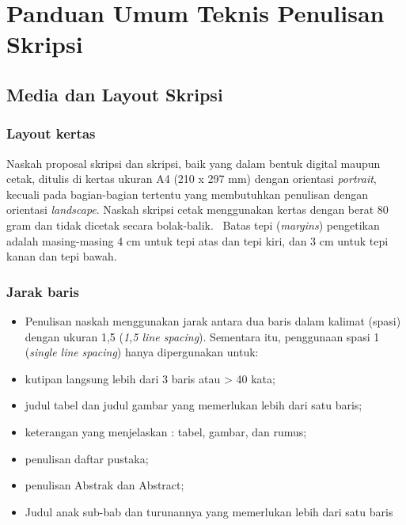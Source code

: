 \documentclass[
  indonesian,
  letterpaper,
]{scrbook}
\providecommand{\tightlist}{%
  \setlength{\itemsep}{0pt}\setlength{\parskip}{0pt}}
\begin{document}
\section{Panduan Umum Teknis Penulisan
Skripsi}\label{panduan-umum-teknis-penulisan-skripsi}

\subsection{Media dan Layout Skripsi}\label{media-dan-layout-skripsi}

\subsubsection{Layout kertas}\label{layout-kertas}

Naskah proposal skripsi dan skripsi, baik yang dalam bentuk digital
maupun cetak, ditulis di kertas ukuran A4 (210 x 297 mm) dengan
orientasi \emph{portrait}, kecuali pada bagian-bagian tertentu yang
membutuhkan penulisan dengan orientasi \emph{landscape}. Naskah skripsi
cetak menggunakan kertas dengan berat 80 gram dan tidak dicetak secara
bolak-balik.~ Batas tepi (\emph{margins}) pengetikan adalah
masing-masing 4 cm untuk tepi atas dan tepi kiri, dan 3 cm untuk tepi
kanan dan tepi bawah.

\subsubsection{Jarak baris}\label{jarak-baris}

\begin{itemize}
\tightlist
\item
  Penulisan naskah menggunakan jarak antara dua baris dalam kalimat
  (spasi) dengan ukuran 1,5 (\emph{1,5 line spacing}). Sementara itu,
  penggunaan spasi 1 (\emph{single line} \emph{spacing}) hanya
  dipergunakan untuk:
\item
  kutipan langsung lebih dari 3 baris atau \textgreater{} 40 kata;
\item
  judul tabel dan judul gambar yang memerlukan lebih dari satu baris;
\item
  keterangan yang menjelaskan : tabel, gambar, dan rumus;
\item
  penulisan daftar pustaka;
\item
  penulisan Abstrak dan Abstract;
\item
  Judul anak sub-bab dan turunannya yang memerlukan lebih dari satu
  baris
\end{itemize}
\end{document}

